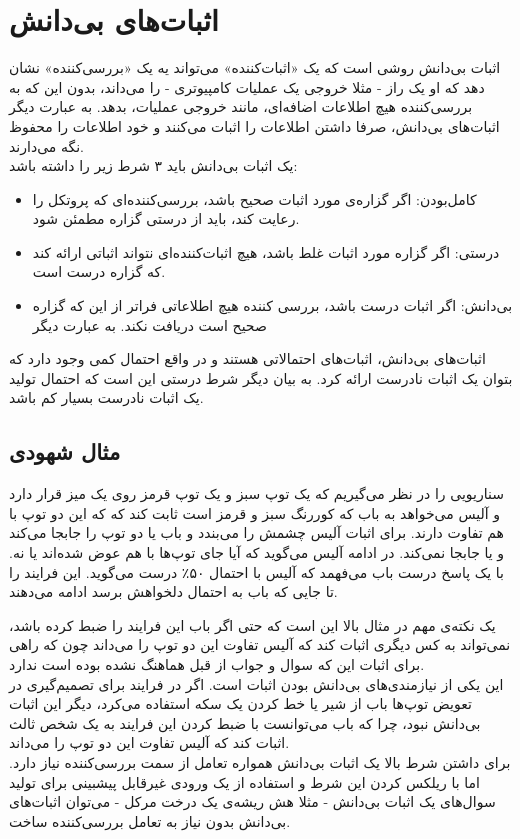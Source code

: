 \section{اثبات‌های بی‌دانش}
اثبات‌ بی‌دانش 
روشی است که یک «اثبات‌کننده» می‌تواند یه یک «بررسی‌کننده» نشان دهد که او یک راز - مثلا خروجی یک عملیات کامپیوتری - را می‌داند، بدون این که به بررسی‌کننده هیچ اطلاعات اضافه‌ای، مانند خروجی عملیات، بدهد. به عبارت دیگر اثبات‌های بی‌دانش، صرفا داشتن اطلاعات را اثبات می‌کنند و خود اطلاعات را محفوظ نگه‌ می‌دارند.
\\
یک اثبات بی‌دانش باید ۳ شرط زیر را داشته باشد:
\begin{itemize}
	\item
	کامل‌بودن: اگر گزاره‌ی مورد اثبات صحیح باشد، بررسی‌کننده‌ای که پروتکل را رعایت کند، باید از درستی گزاره مطمئن شود.
	\item 
	درستی: اگر گزاره مورد اثبات غلط باشد، هیچ اثبات‌کننده‌ای نتواند اثباتی ارائه کند که گزاره درست است. 
	\item 
	بی‌دانش: اگر اثبات درست باشد، بررسی کننده هیچ اطلاعاتی فراتر از این که گزاره صحیح است دریافت نکند. به عبارت دیگر 
\end{itemize}
اثبات‌های بی‌دانش، اثبات‌های احتمالاتی هستند و در واقع احتمال کمی وجود دارد که بتوان یک اثبات نادرست ارائه کرد. به بیان دیگر شرط درستی این است که احتمال تولید یک اثبات نادرست بسیار کم باشد. 
\subsection{مثال شهودی}
سناریویی را در نظر می‌گیریم که یک توپ سبز و یک توپ قرمز روی یک میز قرار دارد و آلیس می‌خواهد به باب که کوررنگ سبز و قرمز است ثابت کند که که این دو توپ با هم تفاوت دارند. برای اثبات آلیس چشمش را می‌بندد و باب یا دو توپ را جابجا می‌کند و یا جابجا نمی‌کند. در ادامه آلیس می‌گوید که آیا جای توپ‌ها با هم عوض شده‌اند یا نه. با یک پاسخ درست باب می‌فهمد که آلیس با احتمال ۵۰٪ درست می‌گوید. این فرایند را تا جایی که باب به احتمال دلخواهش برسد ادامه می‌دهند.
\par
یک نکته‌ی مهم در مثال بالا این است که حتی اگر باب این فرایند را ضبط کرده باشد، نمی‌تواند به کس دیگری اثبات کند که آلیس تفاوت این دو توپ را می‌داند چون که راهی برای اثبات این که سوال و جواب از قبل هماهنگ نشده بوده است ندارد. 
\\
این یکی از نیازمندی‌های بی‌دانش بودن اثبات است. اگر در فرایند برای تصمیم‌گیری در تعویض توپ‌ها باب از شیر یا خط کردن یک سکه استفاده می‌کرد، دیگر این اثبات بی‌دانش نبود، چرا که باب می‌توانست با ضبط کردن این فرایند به یک شخص ثالث اثبات کند که آلیس تفاوت این دو توپ را می‌داند. 
\\
برای داشتن شرط بالا یک اثبات بی‌دانش همواره تعامل از سمت بررسی‌کننده نیاز دارد. اما با ریلکس کردن این شرط و استفاده از یک ورودی غیرقابل پیشبینی برای تولید سوال‌های یک اثبات بی‌دانش - مثلا هش ریشه‌ی یک درخت مرکل - می‌توان اثبات‌های بی‌دانش بدون نیاز به تعامل بررسی‌کننده ساخت. 


